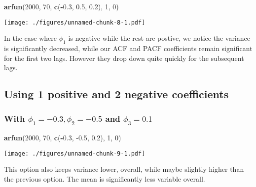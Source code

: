 \documentclass[]{article}
\newenvironment{Shaded}{\begin{snugshade}}{\end{snugshade}}
\newcommand{\DecValTok}[1]{\textcolor[rgb]{0.00,0.00,0.81}{#1}}
\newcommand{\FloatTok}[1]{\textcolor[rgb]{0.00,0.00,0.81}{#1}}
\newcommand{\KeywordTok}[1]{\textcolor[rgb]{0.13,0.29,0.53}{\textbf{#1}}}
\newcommand{\NormalTok}[1]{#1}
\newcommand{\OperatorTok}[1]{\textcolor[rgb]{0.81,0.36,0.00}{\textbf{#1}}}
\begin{document}
\begin{Shaded}
\begin{Highlighting}[]
\KeywordTok{arfun}\NormalTok{(}\DecValTok{2000}\NormalTok{, }\DecValTok{70}\NormalTok{, }\KeywordTok{c}\NormalTok{(}\OperatorTok{-}\FloatTok{0.3}\NormalTok{, }\FloatTok{0.5}\NormalTok{, }\FloatTok{0.2}\NormalTok{), }\DecValTok{1}\NormalTok{, }\DecValTok{0}\NormalTok{)}
\end{Highlighting}
\end{Shaded}

\texttt{[image: ./figures/unnamed-chunk-8-1.pdf]}

In the case where \(\phi_1\) is negative while the rest are postive, we
notice the variance is significantly decreased, while our ACF and PACF
coefficients remain significant for the first two lags. However they
drop down quite quickly for the subsequent lags.

\hypertarget{using-1-positive-and-2-negative-coefficients}{%
\subsection{Using 1 positive and 2 negative
coefficients}\label{using-1-positive-and-2-negative-coefficients}}

\hypertarget{with-phi_1--0.3-phi_2--0.5-and-phi_3-0.1}{%
\subsubsection{\texorpdfstring{With \(\phi_1 = -0.3, \phi_2 = -0.5\) and
\(\phi_3 = 0.1\)}{With \textbackslash{}phi\_1 = -0.3, \textbackslash{}phi\_2 = -0.5 and \textbackslash{}phi\_3 = 0.1}}\label{with-phi_1--0.3-phi_2--0.5-and-phi_3-0.1}}

\begin{Shaded}
\begin{Highlighting}[]
\KeywordTok{arfun}\NormalTok{(}\DecValTok{2000}\NormalTok{, }\DecValTok{70}\NormalTok{, }\KeywordTok{c}\NormalTok{(}\OperatorTok{-}\FloatTok{0.3}\NormalTok{, }\FloatTok{-0.5}\NormalTok{, }\FloatTok{0.2}\NormalTok{), }\DecValTok{1}\NormalTok{, }\DecValTok{0}\NormalTok{)}
\end{Highlighting}
\end{Shaded}

\texttt{[image: ./figures/unnamed-chunk-9-1.pdf]}

This option also keeps variance lower, overall, while maybe slightly
higher than the previous option. The mean is significantly less variable
overall.
\end{document}
